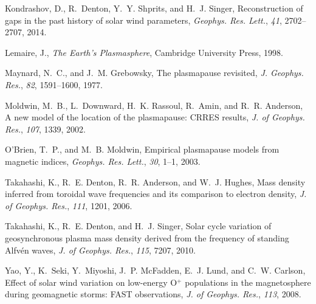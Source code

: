 \documentclass[draft,linenumbers]{agujournal}
\begin{document}
\begin{thebibliography}{16}
	{Kondrashov}, D., R.~{Denton}, Y.~Y. {Shprits}, and H.~J. {Singer},
	{Reconstruction of gaps in the past history of solar wind parameters}, {\it
		Geophys. Res. Lett.\/}, {\it 41\/}, 2702--2707, 2014.
	
	Lemaire, J., {\it The Earth's Plasmasphere\/}, Cambridge University Press,
	1998.
	
	Maynard, N.~C., and J.~M. Grebowsky, The plasmapause revisited, {\it J.
		Geophys. Res.\/}, {\it 82\/}, 1591--1600, 1977.
	
	{Moldwin}, M.~B., L.~{Downward}, H.~K. {Rassoul}, R.~{Amin}, and R.~R.
	{Anderson}, {A new model of the location of the plasmapause: CRRES results},
	{\it J. of Geophys. Res.\/}, {\it 107\/}, 1339, 2002.
	
	{O'Brien}, T.~P., and M.~B. {Moldwin}, {Empirical plasmapause models from
		magnetic indices}, {\it Geophys. Res. Lett.\/}, {\it 30\/}, 1--1, 2003.
	
	{Takahashi}, K., R.~E. {Denton}, R.~R. {Anderson}, and W.~J. {Hughes}, {Mass
		density inferred from toroidal wave frequencies and its comparison to
		electron density}, {\it J. of Geophys. Res.\/}, {\it 111\/}, 1201, 2006.
	
	{Takahashi}, K., R.~E. {Denton}, and H.~J. {Singer}, {Solar cycle variation of
		geosynchronous plasma mass density derived from the frequency of standing
		Alfv{\'e}n waves}, {\it J. of Geophys. Res.\/}, {\it 115\/}, 7207, 2010.
	
	{Yao}, Y., K.~{Seki}, Y.~{Miyoshi}, J.~P. {McFadden}, E.~J. {Lund}, and C.~W.
	{Carlson}, {Effect of solar wind variation on low-energy O$^+$ populations in
		the magnetosphere during geomagnetic storms: FAST observations}, {\it J. of
		Geophys. Res.\/}, {\it 113\/}, 2008.
	
\end{thebibliography}
\end{document}
